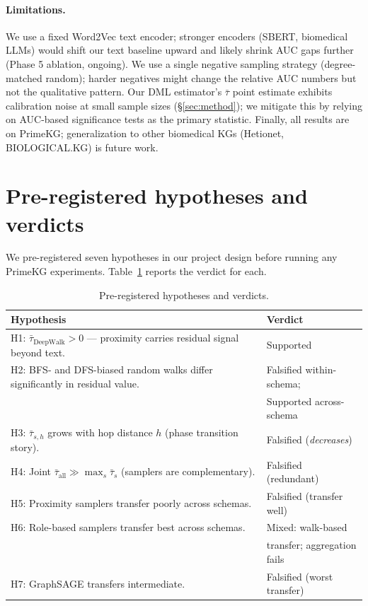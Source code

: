 \documentclass[11pt]{article}
\begin{document}
\paragraph{Limitations.} We use a fixed Word2Vec text encoder; stronger encoders (SBERT, biomedical LLMs) would shift our text baseline upward and likely shrink AUC gaps further (Phase 5 ablation, ongoing). We use a single negative sampling strategy (degree-matched random); harder negatives might change the relative AUC numbers but not the qualitative pattern. Our DML estimator's $\bar\tau$ point estimate exhibits calibration noise at small sample sizes (\S\ref{sec:method}); we mitigate this by relying on AUC-based significance tests as the primary statistic. Finally, all results are on PrimeKG; generalization to other biomedical KGs (Hetionet, BIOLOGICAL.KG) is future work.

\section*{Pre-registered hypotheses and verdicts}

We pre-registered seven hypotheses in our project design before running any PrimeKG experiments. Table~\ref{tab:verdicts} reports the verdict for each.

\begin{table}[h!]
\centering
\caption{Pre-registered hypotheses and verdicts.}
\label{tab:verdicts}
\small
\begin{tabular}{p{} l}
\toprule
Hypothesis & Verdict \\
\midrule
H1: $\bar\tau_{\mathrm{DeepWalk}} > 0$ — proximity carries residual signal beyond text. & Supported \\
H2: BFS- and DFS-biased random walks differ significantly in residual value. & Falsified within-schema; \\
& Supported across-schema \\
H3: $\bar\tau_{s,h}$ grows with hop distance $h$ (phase transition story). & Falsified (\emph{decreases}) \\
H4: Joint $\bar\tau_{\mathrm{all}} \gg \max_s \bar\tau_s$ (samplers are complementary). & Falsified (redundant) \\
H5: Proximity samplers transfer poorly across schemas. & Falsified (transfer well) \\
H6: Role-based samplers transfer best across schemas. & Mixed: walk-based \\
& transfer; aggregation fails \\
H7: GraphSAGE transfers intermediate. & Falsified (worst transfer) \\
\bottomrule
\end{tabular}
\end{table}
\end{document}
